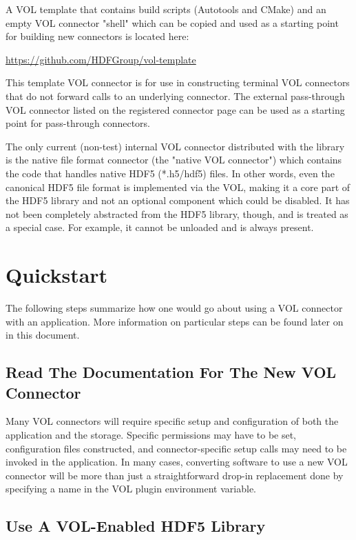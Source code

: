 A VOL template that contains build scripts (Autotools and CMake) and an empty VOL connector "shell" which can be copied and used as a starting point for building new connectors is located here:

\url{https://github.com/HDFGroup/vol-template}

This template VOL connector is for use in constructing terminal VOL connectors that do not forward calls to an underlying connector. The external pass-through VOL connector listed on the registered connector page can be used as a starting point for pass-through connectors.

The only current (non-test) internal VOL connector distributed with the library is the native file format connector (the "native VOL connector") which contains the code that handles native HDF5 (*.h5/hdf5) files. In other words, even the canonical HDF5 file format is implemented via the VOL, making it a core part of the HDF5 library and not an optional component which could be disabled. It has not been completely abstracted from the HDF5 library, though, and is treated as a special case. For example, it cannot be unloaded and is always present.


\section{Quickstart}

The following steps summarize how one would go about using a VOL connector with an application. More information on particular steps can be found later on in this document.

\subsection{Read The Documentation For The New VOL Connector}

Many VOL connectors will require specific setup and configuration of both the application and the storage. Specific permissions may have to be set, configuration files constructed, and connector-specific setup calls may need to be invoked in the application. In many cases, converting software to use a new VOL connector will be more than just a straightforward drop-in replacement done by specifying a name in the VOL plugin environment variable.

\subsection{Use A VOL-Enabled HDF5 Library}

